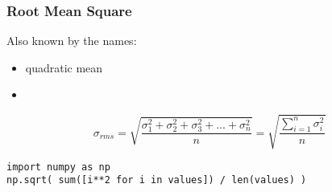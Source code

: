 \documentclass[11pt, oneside]{article}   	%
\begin{document}
\subsubsection{Root Mean Square}
Also known by the names:
\begin{itemize}
\item quadratic mean
\item 
\end{itemize}


\begin{equation}
\sigma_{rms} = \sqrt{\frac{\sigma_1^2 + \sigma_2^2 + \sigma_3^2 + ... + \sigma_n^2}{n}} = \sqrt{\frac{\sum_{i=1}^n  \sigma_i^2}{n}} 
\end{equation}
\lstset{language=Python}
\begin{lstlisting}
import numpy as np
np.sqrt( sum([i**2 for i in values]) / len(values) )
\end{lstlisting}



\end{document}
